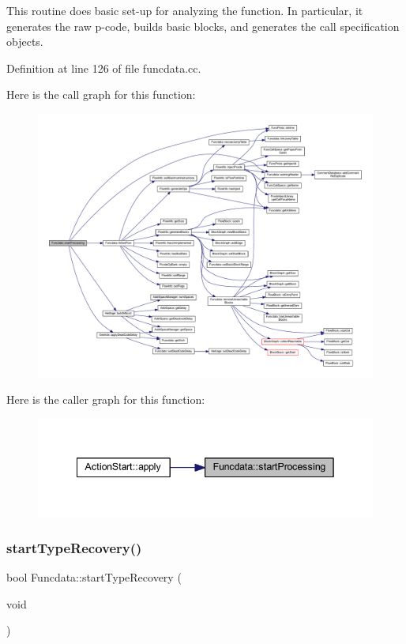 This routine does basic set-\/up for analyzing the function. In particular, it generates the raw p-\/code, builds basic blocks, and generates the call specification objects. 

Definition at line 126 of file funcdata.\+cc.

Here is the call graph for this function\+:
\nopagebreak
\begin{figure}[H]
\begin{center}
\leavevmode
\includegraphics[width=350pt]{class_funcdata_a0637a2c7f6a1e511284cfeecb4b0d475_cgraph}
\end{center}
\end{figure}
Here is the caller graph for this function\+:
\nopagebreak
\begin{figure}[H]
\begin{center}
\leavevmode
\includegraphics[width=342pt]{class_funcdata_a0637a2c7f6a1e511284cfeecb4b0d475_icgraph}
\end{center}
\end{figure}
\mbox{\label{class_funcdata_a0add0ec99a303d6cdfc5187bb2c768f7}} 
\subsubsection{\texorpdfstring{startTypeRecovery()}{startTypeRecovery()}}
{\footnotesize\ttfamily bool Funcdata\+::start\+Type\+Recovery (\begin{DoxyParamCaption}\item[{void}]{ }\end{DoxyParamCaption})}



